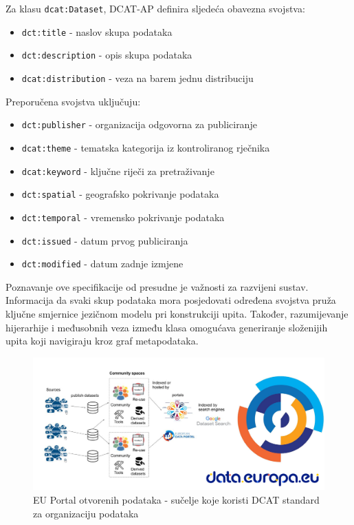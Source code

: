 Za klasu \texttt{dcat:Dataset}, DCAT-AP definira sljedeća obavezna svojstva:

\begin{itemize}
    \item \texttt{dct:title} - naslov skupa podataka
    \item \texttt{dct:description} - opis skupa podataka
    \item \texttt{dcat:distribution} - veza na barem jednu distribuciju
\end{itemize}

Preporučena svojstva uključuju:

\begin{itemize}
    \item \texttt{dct:publisher} - organizacija odgovorna za publiciranje
    \item \texttt{dcat:theme} - tematska kategorija iz kontroliranog rječnika
    \item \texttt{dcat:keyword} - ključne riječi za pretraživanje
    \item \texttt{dct:spatial} - geografsko pokrivanje podataka
    \item \texttt{dct:temporal} - vremensko pokrivanje podataka
    \item \texttt{dct:issued} - datum prvog publiciranja
    \item \texttt{dct:modified} - datum zadnje izmjene
\end{itemize}

Poznavanje ove specifikacije od presudne je važnosti za razvijeni sustav. Informacija da svaki skup podataka mora posjedovati određena svojstva pruža ključne smjernice jezičnom modelu pri konstrukciji upita. Također, razumijevanje hijerarhije i međusobnih veza između klasa omogućava generiranje složenijih upita koji navigiraju kroz graf metapodataka.

\begin{figure}[htbp]
    \centering
    \includegraphics[width=1\textwidth]{figures/Data_Europe.png}
    \caption{EU Portal otvorenih podataka - sučelje koje koristi DCAT standard za organizaciju podataka}
    \label{fig:eu_data_portal}
\end{figure}

